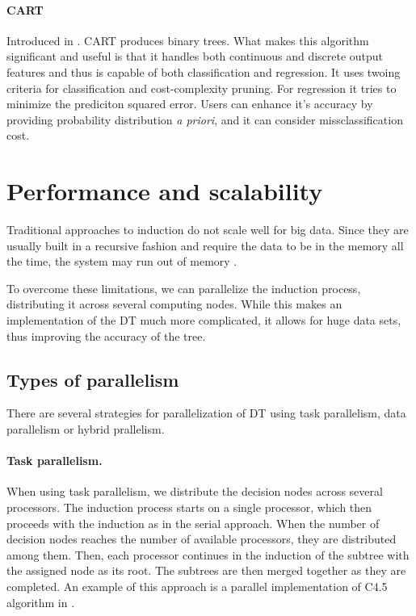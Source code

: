 \documentclass[thesis=B,english]{FITthesis}[2012/10/20]
\begin{document}
			\paragraph*{CART} Introduced in \cite{CART}. CART produces binary trees. What makes this algorithm significant and useful is that it handles both continuous and discrete output features and thus is capable of both classification and regression. It uses twoing criteria for classification and cost-complexity pruning. For regression it tries to minimize the prediciton squared error. Users can enhance it's accuracy by providing probability distribution \textit{a priori}, and it can consider missclassification cost.

		\section{Performance and scalability}
		Traditional approaches to induction do not scale well for big data. Since they are usually built in a recursive fashion and require the data to be in the memory all the time, the system may run out of memory \cite{SCALABLE_RDF}. 

		To overcome these limitations, we can parallelize the induction process, distributing it across several computing nodes. While this makes an implementation of the DT much more complicated, it allows for huge data sets, thus improving the accuracy of the tree.

		\subsection{Types of parallelism}
		There are several strategies for parallelization of DT using task parallelism, data parallelism or hybrid prallelism. \cite{PARALLEL_IMPLEMENTATION}
		\paragraph*{Task parallelism.} When using task parallelism, we distribute the decision nodes across several processors. The induction process starts on a single processor, which then proceeds with the induction as in the serial approach. When the number of decision nodes reaches the number of available processors, they are distributed among them. Then, each processor continues in the induction of the subtree with the assigned node as its root. The subtrees are then merged together as they are completed. An example of this approach is a parallel implementation of C4.5 algorithm in \cite{PARALLEL_INDUCTION}.
\end{document}
